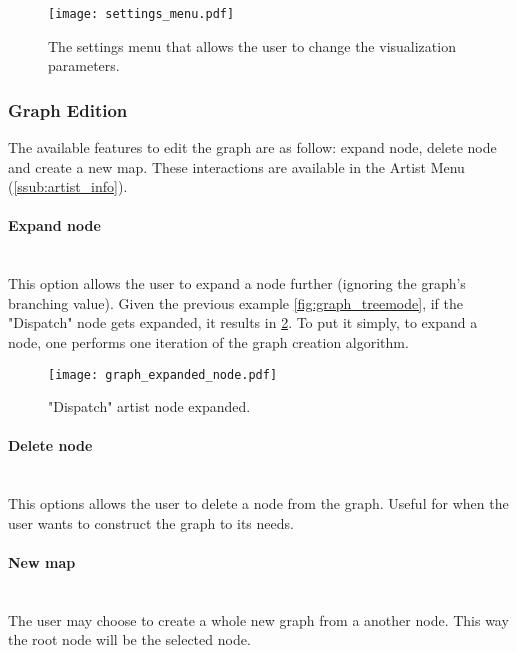     \begin{figure}[H]
      \begin{center}
        \texttt{[image: settings\_menu.pdf]}
      \end{center}
      \caption{The settings menu that allows the user to change the visualization parameters.}
      \label{fig:settings_menu} 
    \end{figure}


    \subsubsection{Graph Edition} %
      \label{ssub:edition}

      The available features to edit the graph are as follow: expand node, delete node and create a new map.
      These interactions are available in the Artist Menu (\ref{ssub:artist_info}).

      \paragraph{Expand node} \hfill \\
      This option allows the user to expand a node further (ignoring the graph's branching value).
      Given the previous example \ref{fig:graph_treemode}, if the "Dispatch" node gets expanded, it results in \ref{fig:node_expanded}.
      To put it simply, to expand a node, one performs one iteration of the graph creation algorithm.

      \begin{figure}[tb]
         \begin{center}
           \texttt{[image: graph\_expanded\_node.pdf]}
         \end{center}
         \caption{"Dispatch" artist node expanded.}
         \label{fig:node_expanded}
      \end{figure}

      \paragraph{Delete node} \hfill \\
      This options allows the user to delete a node from the graph.
      Useful for when the user wants to construct the graph to its needs.

      \paragraph{New map} \hfill \\
      The user may choose to create a whole new graph from a another node.
      This way the root node will be the selected node.


